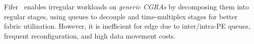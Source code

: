 \begin{comment}
Extensor~\cite{extensor} leverages hierarchical tensor intersections in an inner-product flow, capitalizing data sparsity at various levels of granularity.  However, Extensor's dataflow approach, while efficient, comes at the cost of reduced programmability, limiting its capability to handle a broad range of sparse tensor operations efficiently.
\iffalse
Dalorex~\cite{dalorex} employs an execution model that 
splits loops into tasks at every pointer indirection. It distributes data uniformly across tiles enabling local execution of tasks in proximity to the corresponding data. The tiles are organized in a 2D torus topology with ruche network~\cite{ruche} where each tile has an in-order core with a scratchpad, a scheduling unit, and a router.
Parent tasks on completion spawn the next task's parameters into the NoC.
\textit{Nexus Machine}'s in-network computation realizes better load balancing as it is able to leverage idle PEs on intermediate PEs en-route. Most critically, as Dalorex is architected for servers, it functions at task level granularity with entire tasks executed near data tiles, while \textit{Nexus Machine} has a much finer control at the instruction level granularity,
suitable for edge devices.
\fi

Dalorex~\cite{dalorex} employs a task-based execution model, distributing data uniformly across tiles for localized execution. Tiles are arranged in a 2D torus topology with ruche network~\cite{ruche}, each comprising an in-order core with a scratchpad, scheduling unit, and router. Upon completion, parent tasks spawns parameters for subsequent tasks into the NoC.
\textit{Nexus Machine} realizes better load balancing through in-network computation, leveraging idle PEs en-route. While Dalorex operates at task-level granularity, suited for servers, \textit{Nexus Machine} offers finer control at the instruction level, ideal for edge devices.
\end{comment}
Fifer~\cite{fifer} enables irregular workloads on \textit{generic CGRAs} by decomposing them into regular stages, using queues to decouple and time-multiplex stages for better fabric utilization. However, it is inefficient for edge due to inter/intra-PE queues, frequent reconfiguration, and high data movement costs.
